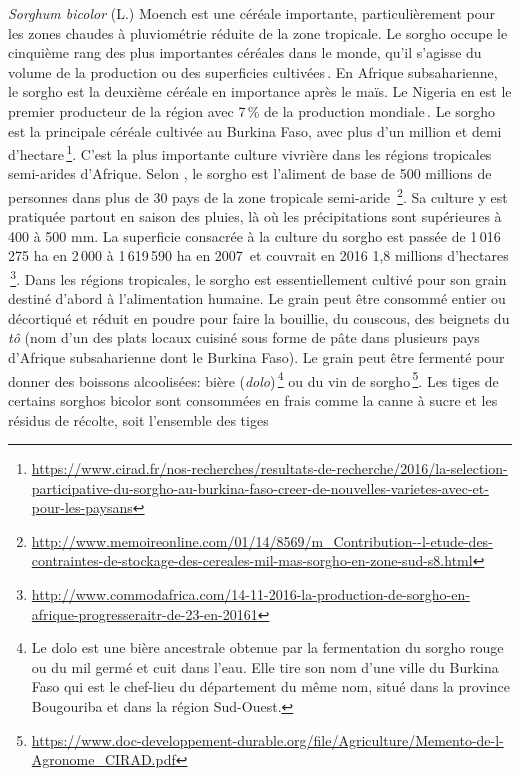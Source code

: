 \documentclass[a4paper,11pt]{article}
\begin{document}
\emph{Sorghum bicolor} (L.) Moench est une céréale importante,
particulièrement pour les zones chaudes à pluviométrie réduite de la
zone tropicale. Le sorgho occupe le cinquième rang des plus
importantes céréales dans le monde, qu'il s'agisse du volume de la
production ou des superficies cultivées\,\cite{FAOICRISAT_1997}. En
Afrique subsaharienne, le sorgho est la deuxième céréale en importance
après le maïs. Le Nigeria en est le premier producteur de la région
avec 7\,\% de la production mondiale\,\cite{FAO_1995}. Le sorgho est
la principale céréale cultivée au Burkina Faso, avec plus d'un million
et demi
d'hectare\,\footnote{\url{https://www.cirad.fr/nos-recherches/resultats-de-recherche/2016/la-selection-participative-du-sorgho-au-burkina-faso-creer-de-nouvelles-varietes-avec-et-pour-les-paysans}}. C'est
la plus importante culture vivrière dans les régions tropicales
semi-arides d'Afrique. Selon , le sorgho est
l'aliment de base de 500 millions de personnes dans plus de 30 pays de
la zone tropicale semi-aride
\,\footnote{\url{http://www.memoireonline.com/01/14/8569/m_Contribution--l-etude-des-contraintes-de-stockage-des-cereales-mil-mas-sorgho-en-zone-sud-s8.html}}.
Sa culture y est pratiquée partout en saison des pluies, là où les
précipitations sont supérieures à 400 à 500 mm. La superficie
consacrée à la culture du sorgho est passée de 1\,016\,275 ha en
2\,000 à 1\,619\,590 ha en 2007\,\cite{FAO_2007} et couvrait en 2016
1,8 millions d'hectares
\,\footnote{\url{http://www.commodafrica.com/14-11-2016-la-production-de-sorgho-en-afrique-progresseraitr-de-23-en-20161}}. Dans
les régions tropicales, le sorgho est essentiellement cultivé pour son
grain destiné d'abord à l'alimentation humaine. Le grain peut être
consommé entier ou décortiqué et réduit en poudre pour faire la
bouillie, du couscous, des beignets du \emph{tô} (nom d'un des plats
locaux cuisiné sous forme de pâte dans plusieurs pays d'Afrique
subsaharienne dont le Burkina Faso). Le grain peut être fermenté pour
donner des boissons alcoolisées: bière (\emph{dolo})\,\footnote{Le dolo
  est une bière ancestrale obtenue par la fermentation du sorgho rouge
  ou du mil germé et cuit dans l'eau. Elle tire son nom d'une ville du
  Burkina Faso qui est le chef-lieu du département du même nom, situé
  dans la province Bougouriba et dans la région Sud-Ouest.} ou du vin de
sorgho\,\footnote{\url{https://www.doc-developpement-durable.org/file/Agriculture/Memento-de-l-Agronome_CIRAD.pdf}}.
Les tiges de certains sorghos bicolor sont consommées en frais comme
la canne à sucre et les résidus de récolte, soit l'ensemble des tiges
\end{document}

